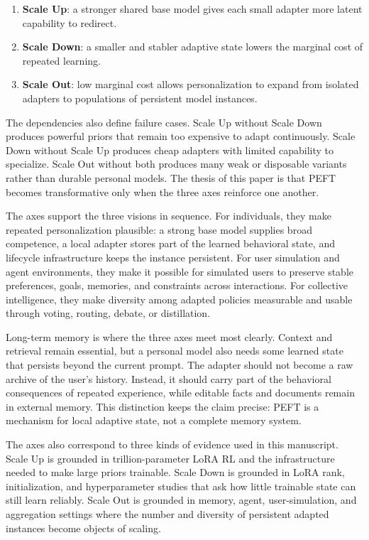 \documentclass{llmxive}
\providecommand{\pony}[1]{#1}
\begin{document}
\begin{enumerate}
    \item \pony{\textbf{Scale Up}: a stronger shared base model gives each small adapter more latent capability to redirect.}
    \item \pony{\textbf{Scale Down}: a smaller and stabler adaptive state lowers the marginal cost of repeated learning.}
    \item \pony{\textbf{Scale Out}: low marginal cost allows personalization to expand from isolated adapters to populations of persistent model instances.}
\end{enumerate}

\pony{The dependencies also define failure cases. Scale Up without Scale Down produces powerful priors that remain too expensive to adapt continuously. Scale Down without Scale Up produces cheap adapters with limited capability to specialize. Scale Out without both produces many weak or disposable variants rather than durable personal models. The thesis of this paper is that PEFT becomes transformative only when the three axes reinforce one another.}

\pony{The axes support the three visions in sequence. For individuals, they make repeated personalization plausible: a strong base model supplies broad competence, a local adapter stores part of the learned behavioral state, and lifecycle infrastructure keeps the instance persistent. For user simulation and agent environments, they make it possible for simulated users to preserve stable preferences, goals, memories, and constraints across interactions. For collective intelligence, they make diversity among adapted policies measurable and usable through voting, routing, debate, or distillation.}

\pony{Long-term memory is where the three axes meet most clearly. Context and retrieval remain essential, but a personal model also needs some learned state that persists beyond the current prompt. The adapter should not become a raw archive of the user's history. Instead, it should carry part of the behavioral consequences of repeated experience, while editable facts and documents remain in external memory. This distinction keeps the claim precise: PEFT is a mechanism for local adaptive state, not a complete memory system.}

\pony{The axes also correspond to three kinds of evidence used in this manuscript. Scale Up is grounded in trillion-parameter LoRA RL and the infrastructure needed to make large priors trainable. Scale Down is grounded in LoRA rank, initialization, and hyperparameter studies that ask how little trainable state can still learn reliably. Scale Out is grounded in memory, agent, user-simulation, and aggregation settings where the number and diversity of persistent adapted instances become objects of scaling.}
\end{document}
